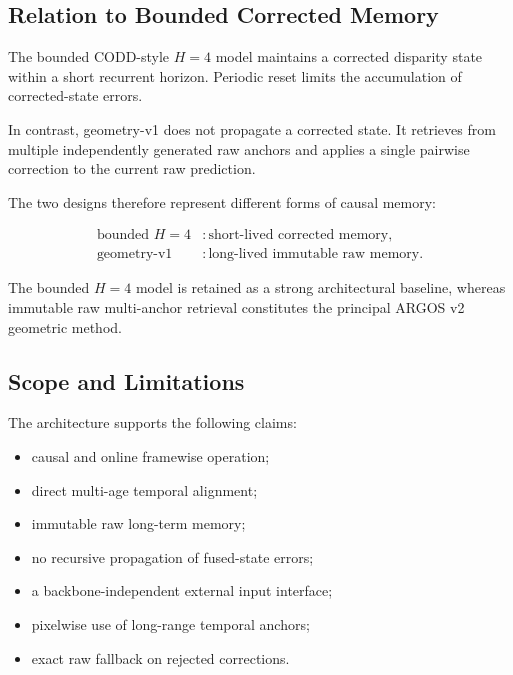 \documentclass[11pt,a4paper]{article}
\begin{document}
\subsection{Relation to Bounded Corrected Memory}
\label{sec:h4_relation}

The bounded CODD-style \(H=4\) model maintains a corrected disparity
state within a short recurrent horizon. Periodic reset limits the
accumulation of corrected-state errors.

In contrast, geometry-v1 does not propagate a corrected state. It
retrieves from multiple independently generated raw anchors and applies
a single pairwise correction to the current raw prediction.

The two designs therefore represent different forms of causal memory:

\begin{equation}
\boxed{
\begin{aligned}
\text{bounded }H=4
&:
\text{short-lived corrected memory},
\\
\text{geometry-v1}
&:
\text{long-lived immutable raw memory}.
\end{aligned}
}
\end{equation}

The bounded \(H=4\) model is retained as a strong architectural baseline,
whereas immutable raw multi-anchor retrieval constitutes the principal
ARGOS v2 geometric method.

\subsection{Scope and Limitations}
\label{sec:scope_limitations}

The architecture supports the following claims:

\begin{itemize}
    \item causal and online framewise operation;
    \item direct multi-age temporal alignment;
    \item immutable raw long-term memory;
    \item no recursive propagation of fused-state errors;
    \item a backbone-independent external input interface;
    \item pixelwise use of long-range temporal anchors;
    \item exact raw fallback on rejected corrections.
\end{itemize}
\end{document}
